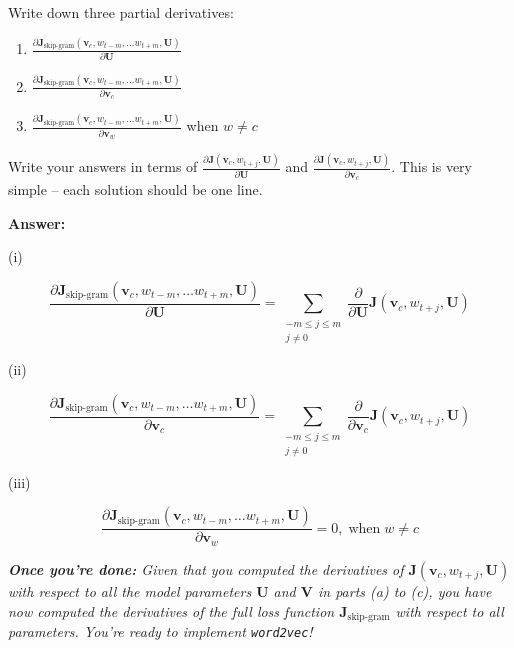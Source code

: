 \documentclass{article}
\newenvironment{answer}{
    {\bf Answer:} \sf \begingroup\color{red}
}{\endgroup}%
\begin{document}
\begin{enumerate}[label=(\alph*)]
Write down three partial derivatives: 
\begin{enumerate}[label=(\roman*)]
    \item ${\frac{\partial \bm J_{\textrm{skip-gram}}(\bm v_c, w_{t-m},\ldots w_{t+m}, \bm U)} {\partial \bm U}}$
    \item ${\frac{\partial \bm J_{\textrm{skip-gram}}(\bm v_c, w_{t-m},\ldots w_{t+m}, \bm U)} {\partial \bm v_c}}$
    \item ${\frac{\partial \bm J_{\textrm{skip-gram}}(\bm v_c, w_{t-m},\ldots w_{t+m}, \bm U)} {\partial \bm v_w}}$ when $w \ne c$
\end{enumerate}
Write your answers in terms of ${\frac{\partial \bm J(\bm v_c, w_{t+j}, \bm U)}{\partial \bm U}}$ and ${\frac{\partial \bm J(\bm v_c, w_{t+j}, \bm U)}{\partial \bm v_c}}$. This is very simple -- each solution should be one line.

\begin{shaded}
\begin{answer}

(i)

\begin{equation*}
\frac{\partial \bm J_{\textrm{skip-gram}}(\bm v_c, w_{t-m},\ldots w_{t+m}, \bm U)} {\partial \bm U} = \sum_{\substack{-m\le j \le m \\ j\ne 0}} \frac{\partial}{\partial \bm U} \bm J(\bm v_c, w_{t+j}, \bm U)
\end{equation*}

(ii)

\begin{equation*}
\frac{\partial \bm J_{\textrm{skip-gram}}(\bm v_c, w_{t-m},\ldots w_{t+m}, \bm U)} {\partial \bm v_c} = \sum_{\substack{-m\le j \le m \\ j\ne 0}} \frac{\partial}{\partial \bm v_c} \bm J(\bm v_c, w_{t+j}, \bm U)
\end{equation*}

(iii)

\begin{equation*}
\frac{\partial \bm J_{\textrm{skip-gram}}(\bm v_c, w_{t-m},\ldots w_{t+m}, \bm U)} {\partial \bm v_w} = 0, \; \text{when}\; w \neq c
\end{equation*}
\end{answer}
\end{shaded}

\textit{\textbf{Once you're done:} Given that you computed the derivatives of $\bm J(\bm v_c, w_{t+j}, \bm U)$ with respect to all the model parameters $\bm U$ and $\bm V$ in parts (a) to (c), you have now computed the derivatives of the full loss function $\bm J_{\text{skip-gram}}$ with respect to all parameters. You're ready to implement \texttt{word2vec}!} %

\end{enumerate}
\end{document}

